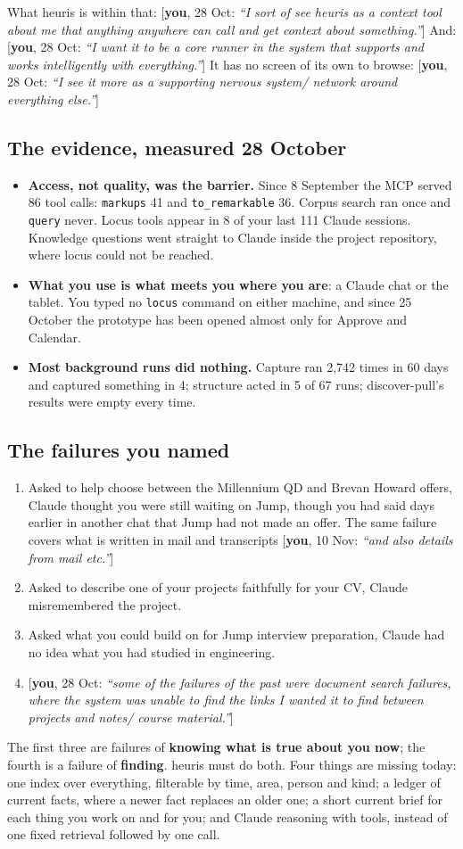 \documentclass[10pt]{extarticle}
\newcommand{\you}[2]{{\small[\textbf{you}, #1: \textit{``#2''}]}}
\newcommand{\Sub}[1]{\subsection*{#1}}
\begin{document}
What heuris is within that: \you{28 Oct}{I sort of see heuris as a context tool about me that anything anywhere can call and get context about something.} And: \you{28 Oct}{I want it to be a core runner in the system that supports and works intelligently with everything.} It has no screen of its own to browse: \you{28 Oct}{I see it more as a supporting nervous system/ network around everything else.}

\Sub{The evidence, measured 28 October}
\begin{itemize}
\item \textbf{Access, not quality, was the barrier.} Since 8 September the MCP served 86 tool calls: \texttt{markups} 41 and \texttt{to\_remarkable} 36. Corpus search ran once and \texttt{query} never. Locus tools appear in 8 of your last 111 Claude sessions. Knowledge questions went straight to Claude inside the project repository, where locus could not be reached.
\item \textbf{What you use is what meets you where you are}: a Claude chat or the tablet. You typed no \texttt{locus} command on either machine, and since 25 October the prototype has been opened almost only for Approve and Calendar.
\item \textbf{Most background runs did nothing.} Capture ran 2,742 times in 60 days and captured something in 4; structure acted in 5 of 67 runs; discover-pull's results were empty every time.
\end{itemize}

\Sub{The failures you named}
\begin{enumerate}
\item Asked to help choose between the Millennium QD and Brevan Howard offers, Claude thought you were still waiting on Jump, though you had said days earlier in another chat that Jump had not made an offer. The same failure covers what is written in mail and transcripts \you{10 Nov}{and also details from mail etc.}
\item Asked to describe one of your projects faithfully for your CV, Claude misremembered the project.
\item Asked what you could build on for Jump interview preparation, Claude had no idea what you had studied in engineering.
\item \you{28 Oct}{some of the failures of the past were document search failures, where the system was unable to find the links I wanted it to find between projects and notes/ course material.}
\end{enumerate}
The first three are failures of \textbf{knowing what is true about you now}; the fourth is a failure of \textbf{finding}. heuris must do both. Four things are missing today: one index over everything, filterable by time, area, person and kind; a ledger of current facts, where a newer fact replaces an older one; a short current brief for each thing you work on and for you; and Claude reasoning with tools, instead of one fixed retrieval followed by one call.
\end{document}
